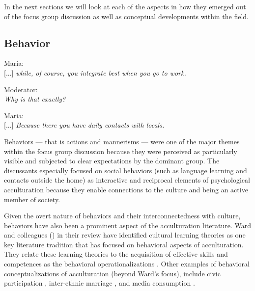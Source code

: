 \documentclass[man, 12pt, a4paper]{apa7}
\begin{document}
In the next sections we will look at each of the aspects in how they emerged out of the focus group discussion as well as conceptual developments within the field. 

\subsection{Behavior}
\begin{displayquote}
    Maria:\\
    {[...]} \textit{while, of course, you integrate best when you go to work.}
    
    Moderator:\\
    \textit{Why is that exactly?}
    
    Maria:\\
    {[...]} \textit{Because there you have daily contacts with locals.}
\end{displayquote}

Behaviors --- that is actions and mannerisms --- were one of the major themes within the focus group discussion because they were perceived as particularly visible and subjected to clear expectations by the dominant group. The discussants especially focused on social behaviors (such as language learning and contacts outside the home) as interactive and reciprocal elements of psychological acculturation because they enable connections to the culture and being an active member of society.

Given the overt nature of behaviors and their interconnectedness with culture, behaviors have also been a prominent aspect of the acculturation literature. Ward and colleagues (\citeyear{Ward2019}) in their review have identified cultural learning theories as one key literature tradition that has focused on behavioral aspects of acculturation. They relate these learning theories to the acquisition of effective skills and competences as the behavioral operationalizations \citep[including, verbal and non-verbal communication skills][]{Ward2001}. Other examples of behavioral conceptualizations of acculturation (beyond Ward's focus), include civic participation \citep[e.g., voting;][]{Lessard-Phillips2020}, inter-ethnic marriage \citep[e.g.,][]{Song2009}, and media consumption \citep[e.g.,][]{Shoemaker1985}. 
\end{document}
